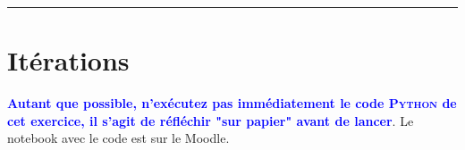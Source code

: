
\newcommand{\numTD}{TD6}
\newcommand{\themeTD}{Logique}



\hrule

\noindent{}

\section{Itérations}

\textcolor{blue}{\bf{Autant que possible, n'exécutez pas immédiatement le code \textsc{Python}} de cet exercice, il s'agit de réfléchir "sur papier" avant de lancer}. Le notebook avec le code est sur le Moodle.

